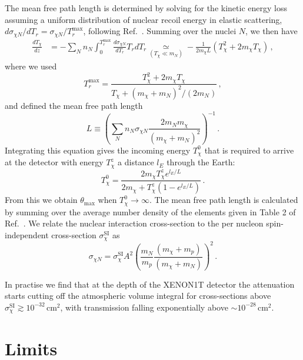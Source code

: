 The mean free path length is determined by solving for the kinetic energy loss assuming a uniform distribution of nuclear recoil energy in elastic scattering, $d\sigma_{\chi N}/dT_r = \sigma_{\chi N} / T_r^{\mathrm{max}}$, following Ref.~\cite{Bringmann:2018cvk}. Summing over the nuclei $N$, we then have
%
\begin{align}
\frac{dT_\chi}{dz} &= - \sum_N n_N \int_0^{T_r^{\mathrm{max}}} \frac{d\sigma_{\chi N}}{dT_r} T_r dT_r \nonumber \underset{(T_\chi \ll m_N) }{\simeq} -\frac{1}{2m_\chi L}\left(T_\chi^2 + 2 m_\chi T_\chi \right) \, ,
\end{align}
%
where we used
%
\begin{equation}
T_r^{\mathrm{max}} = \frac{T_\chi^2 + 2m_\chi T_\chi}{T_\chi + (m_\chi + m_N)^2/(2m_N)} \, ,
\end{equation}
%
and defined the mean free path length
%
\begin{equation}
L \equiv \left( \sum_N n_N \sigma_{\chi N} \frac{2 m_N m_\chi}{(m_\chi + m_N)^2} \right)^{-1} \, .
\end{equation}
%
Integrating this equation gives the incoming energy $T_\chi^0$ that is required to arrive at the detector with energy $T_\chi^z$ a distance $l_E$ through the Earth:
%
\begin{equation}
T_\chi^0 = \frac{2 m_\chi T_\chi^z e^{l_E/L}}{2 m_\chi + T_\chi^z(1-e^{l_E/L})} \, .
\end{equation}
%
From this we obtain $\theta_{\mathrm{max}}$ when $T_\chi^0 \to \infty$. The mean free path length is calculated by summing over the average number density of the elements given in Table 2 of Ref.~\cite{Kavanagh:2016pyr}. We relate the nuclear interaction cross-section to the per nucleon spin-independent cross-section $\sigma_\chi^{\mathrm{SI}}$ as
%
\begin{equation}
\sigma_{\chi N} = \sigma_\chi^{\mathrm{SI}} A^2 \left(\frac{m_N}{m_p} \frac{(m_\chi + m_p)}{(m_\chi + m_N)} \right)^2 \, .
\end{equation} 
%

In practise we find that at the depth of the XENON1T detector the attenuation starts cutting off the atmospheric volume integral for cross-sections above $\sigma_\chi^{\mathrm{SI}} \gtrsim 10^{-32} \, \mathrm{cm}^2$, with transmission falling exponentially above $\sim 10^{-28} \, \mathrm{cm}^2$.

\section{Limits}

